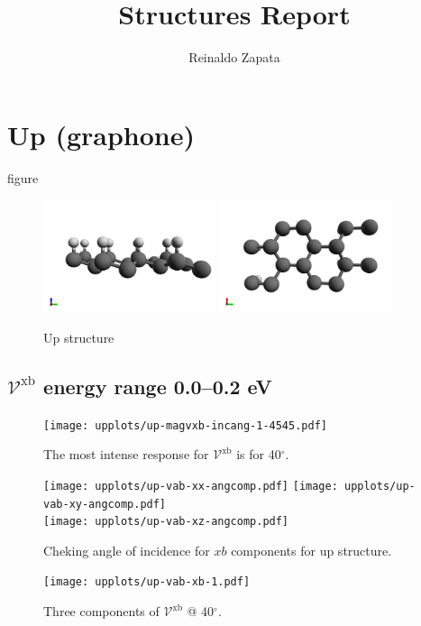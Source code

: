 \documentclass{article}
\title{Structures Report}
\author{Reinaldo Zapata}
\date{}
\let\Oldsection\section
\renewcommand{\section}{\FloatBarrier\Oldsection}
\let\Oldsubsection\subsection
\renewcommand{\subsection}{\FloatBarrier\Oldsubsection}
\begin{document}
\maketitle


\section{Up (graphone)} %
\label{sec:up}
figure

\begin{figure}[h!]
    \centering
    \includegraphics[width=0.45\textwidth]{../up/up-figures/up-1}
    \includegraphics[width=0.45\textwidth]{../up/up-figures/up-2}
    \caption{Up structure}
    \label{fig:upstruc}
\end{figure}

\subsection{$\mathcal{V}^{\mathrm{xb}}$ energy range 0.0--0.2 eV }
\begin{figure}[h]
    \centering
    \texttt{[image: upplots/up-magvxb-incang-1-4545.pdf]}
    \caption{The most intense response for $\mathcal{V}^{\mathrm{xb}} $ is for 
    40$^{\circ}$.}
    \label{fig:up-magvxbincang1}
\end{figure}
\begin{figure}[ht]
    \centering
    \texttt{[image: upplots/up-vab-xx-angcomp.pdf]}
    \texttt{[image: upplots/up-vab-xy-angcomp.pdf]}\\
    \texttt{[image: upplots/up-vab-xz-angcomp.pdf]}
    \caption{Cheking angle of incidence for $xb$ components for up structure.}
    \label{fig:up-xbangcomp}
\end{figure}
\begin{figure}[tb]
    \centering
    \texttt{[image: upplots/up-vab-xb-1.pdf]}
    \caption{Three components of $\mathcal{V}^{\mathrm{xb}} $ @ 40$^{\circ}$.}
    \label{fig:up-vxb1}
\end{figure}
\end{document}
